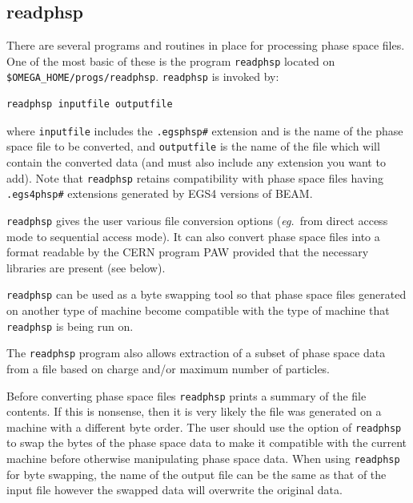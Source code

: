 \documentclass[12pt,twoside]{article}
\newcommand{\eg}{{\em eg.}}
\begin{document}
\subsection{readphsp}
\label{readphspsect}
There are several programs and routines in place for processing phase
space files.  One of the most basic of these is the program \verb+readphsp+
located on \verb+$OMEGA_HOME/progs/readphsp+.
\verb+readphsp+ is invoked by:
\begin{verbatim}
readphsp inputfile outputfile
\end{verbatim}
where \verb+inputfile+ includes the \verb+.egsphsp#+ extension and
is the name of the phase space file to be converted, and
\verb+outputfile+ is the name of the file which will contain the
converted data (and must also include any extension you want
to add).
Note that {\tt readphsp} retains compatibility with phase space files having
{\tt .egs4phsp\#} extensions generated by EGS4 versions of BEAM.

\verb+readphsp+ gives the user various file conversion options (\eg\
from direct access mode to sequential access mode).  It can also convert
\index{PAW}
phase space files into a format readable by the CERN program PAW provided
that the necessary libraries are present (see below).

\verb+readphsp+ can be used as a byte swapping tool so that phase
space files generated on another type of machine become compatible with
the type of machine that \verb+readphsp+ is being run on.

The \verb+readphsp+ program also allows extraction of a subset of
phase space data from a file based on charge and/or maximum number
of particles.

Before converting phase space files \verb+readphsp+ prints a summary of
the file contents.  If this is nonsense, then it is very likely the file
was generated on a machine with a different byte order. The user should use the option of
\verb+readphsp+ to swap the bytes of the phase space data to make it
compatible with the current machine before otherwise manipulating phase
space data.  When using  \verb+readphsp+ for byte
swapping, the name of the output file can be the same as that of the input
file however the swapped data will overwrite the original data.
\end{document}
